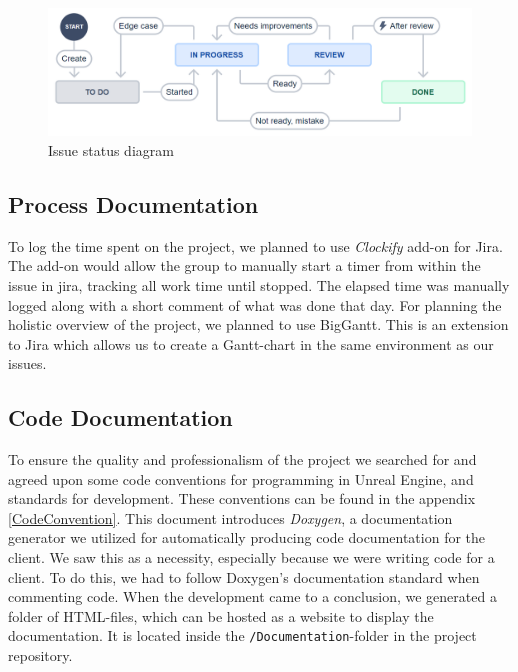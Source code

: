 \begin{figure}[H]
\centerline{\includegraphics[width=1.0\textwidth]{figures/workflow.png}}
\caption{Issue status diagram}
\label{fig:workflow}
\end{figure} 

\subsection{Process Documentation}
\label{subsubsec:processdoc}

To log the time spent on the project, we planned to use \textit{Clockify} add-on for Jira. The add-on would allow the group to manually start a timer from within the issue in \Gls{jira}, tracking all work time until stopped. The elapsed time was manually logged along with a short comment of what was done that day. For planning the holistic overview of the project, we planned to use BigGantt. This is an extension to Jira which allows us to create a Gantt-chart in the same environment as our issues. 

\subsection{Code Documentation}

To ensure the quality and professionalism of the project we searched for and agreed upon some code conventions for \cpp programming in Unreal Engine, and standards for development. These conventions can be found in the appendix \ref{CodeConvention}. This document introduces \textit{Doxygen}, a documentation generator we utilized for automatically producing code documentation for the client. We saw this as a necessity, especially because we were writing code for a client. To do this, we had to follow Doxygen's documentation standard when commenting code. When the development came to a conclusion, we generated a folder of HTML-files, which can be hosted as a website to display the documentation. It is located inside the \verb|/Documentation|-folder in the project repository. 


